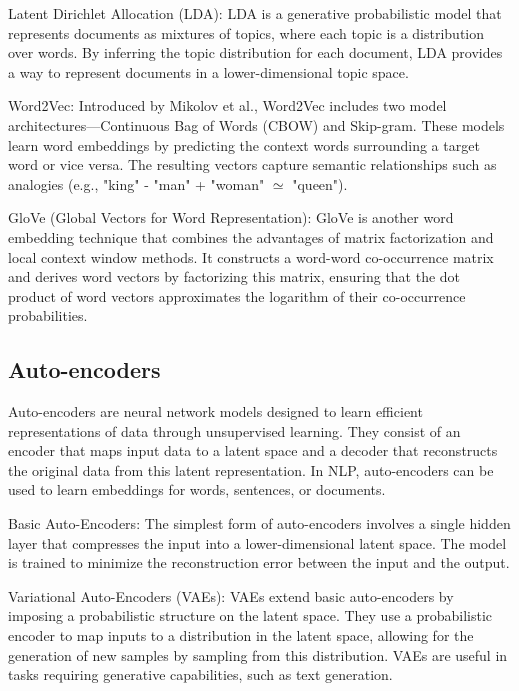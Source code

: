 Latent Dirichlet Allocation (LDA): LDA is a generative probabilistic model that represents documents as mixtures of topics, where each topic is a distribution over words. By inferring the topic distribution for each document, LDA provides a way to represent documents in a lower-dimensional topic space.

Word2Vec: Introduced by Mikolov et al., Word2Vec includes two model architectures—Continuous Bag of Words (CBOW) and Skip-gram. These models learn word embeddings by predicting the context words surrounding a target word or vice versa. The resulting vectors capture semantic relationships such as analogies (e.g., "king" - "man" + "woman" $\simeq$ "queen").

GloVe (Global Vectors for Word Representation): GloVe is another word embedding technique that combines the advantages of matrix factorization and local context window methods. It constructs a word-word co-occurrence matrix and derives word vectors by factorizing this matrix, ensuring that the dot product of word vectors approximates the logarithm of their co-occurrence probabilities.

\subsection{Auto-encoders}
Auto-encoders are neural network models designed to learn efficient representations of data through unsupervised learning. They consist of an encoder that maps input data to a latent space and a decoder that reconstructs the original data from this latent representation. In NLP, auto-encoders can be used to learn embeddings for words, sentences, or documents.

Basic Auto-Encoders: The simplest form of auto-encoders involves a single hidden layer that compresses the input into a lower-dimensional latent space. The model is trained to minimize the reconstruction error between the input and the output.

Variational Auto-Encoders (VAEs): VAEs extend basic auto-encoders by imposing a probabilistic structure on the latent space. They use a probabilistic encoder to map inputs to a distribution in the latent space, allowing for the generation of new samples by sampling from this distribution. VAEs are useful in tasks requiring generative capabilities, such as text generation.

